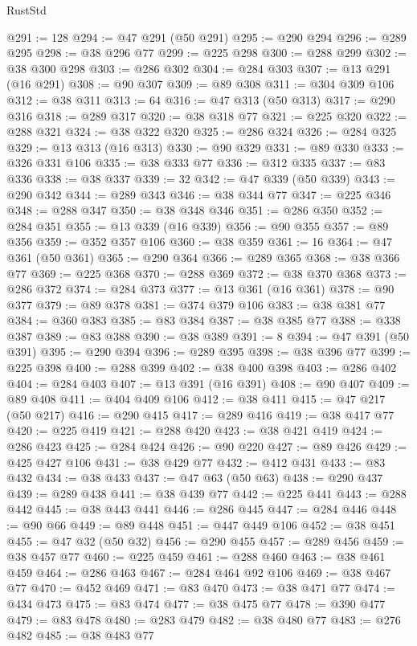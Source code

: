 \begin{lexlean}{RustStd}
\begin{coremodule}
{\begin{coremodule}
{{{{{{{{{{{{{{@291 := 128
@294 := @47 @291 (@50 @291)
@295 := @290 @294
@296 := @289 @295
@298 := @38 @296 @77
@299 := @225 @298
@300 := @288 @299
@302 := @38 @300 @298
@303 := @286 @302
@304 := @284 @303
@307 := @13 @291 (@16 @291)
@308 := @90 @307
@309 := @89 @308
@311 := @304 @309 @106
@312 := @38 @311
@313 := 64
@316 := @47 @313 (@50 @313)
@317 := @290 @316
@318 := @289 @317
@320 := @38 @318 @77
@321 := @225 @320
@322 := @288 @321
@324 := @38 @322 @320
@325 := @286 @324
@326 := @284 @325
@329 := @13 @313 (@16 @313)
@330 := @90 @329
@331 := @89 @330
@333 := @326 @331 @106
@335 := @38 @333 @77
@336 := @312 @335
@337 := @83 @336
@338 := @38 @337
@339 := 32
@342 := @47 @339 (@50 @339)
@343 := @290 @342
@344 := @289 @343
@346 := @38 @344 @77
@347 := @225 @346
@348 := @288 @347
@350 := @38 @348 @346
@351 := @286 @350
@352 := @284 @351
@355 := @13 @339 (@16 @339)
@356 := @90 @355
@357 := @89 @356
@359 := @352 @357 @106
@360 := @38 @359
@361 := 16
@364 := @47 @361 (@50 @361)
@365 := @290 @364
@366 := @289 @365
@368 := @38 @366 @77
@369 := @225 @368
@370 := @288 @369
@372 := @38 @370 @368
@373 := @286 @372
@374 := @284 @373
@377 := @13 @361 (@16 @361)
@378 := @90 @377
@379 := @89 @378
@381 := @374 @379 @106
@383 := @38 @381 @77
@384 := @360 @383
@385 := @83 @384
@387 := @38 @385 @77
@388 := @338 @387
@389 := @83 @388
@390 := @38 @389
@391 := 8
@394 := @47 @391 (@50 @391)
@395 := @290 @394
@396 := @289 @395
@398 := @38 @396 @77
@399 := @225 @398
@400 := @288 @399
@402 := @38 @400 @398
@403 := @286 @402
@404 := @284 @403
@407 := @13 @391 (@16 @391)
@408 := @90 @407
@409 := @89 @408
@411 := @404 @409 @106
@412 := @38 @411
@415 := @47 @217 (@50 @217)
@416 := @290 @415
@417 := @289 @416
@419 := @38 @417 @77
@420 := @225 @419
@421 := @288 @420
@423 := @38 @421 @419
@424 := @286 @423
@425 := @284 @424
@426 := @90 @220
@427 := @89 @426
@429 := @425 @427 @106
@431 := @38 @429 @77
@432 := @412 @431
@433 := @83 @432
@434 := @38 @433
@437 := @47 @63 (@50 @63)
@438 := @290 @437
@439 := @289 @438
@441 := @38 @439 @77
@442 := @225 @441
@443 := @288 @442
@445 := @38 @443 @441
@446 := @286 @445
@447 := @284 @446
@448 := @90 @66
@449 := @89 @448
@451 := @447 @449 @106
@452 := @38 @451
@455 := @47 @32 (@50 @32)
@456 := @290 @455
@457 := @289 @456
@459 := @38 @457 @77
@460 := @225 @459
@461 := @288 @460
@463 := @38 @461 @459
@464 := @286 @463
@467 := @284 @464 @92 @106
@469 := @38 @467 @77
@470 := @452 @469
@471 := @83 @470
@473 := @38 @471 @77
@474 := @434 @473
@475 := @83 @474
@477 := @38 @475 @77
@478 := @390 @477
@479 := @83 @478
@480 := @283 @479
@482 := @38 @480 @77
@483 := @276 @482
@485 := @38 @483 @77
}}}}}}}}}}}}}}
\end{coremodule}}
\end{coremodule}
\end{lexlean}
